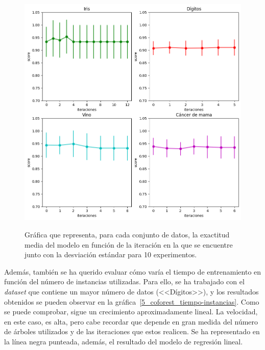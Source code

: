 \begin{figure}[h]
	\caption{Gráfica que representa, para cada conjunto de datos, la exactitud media del modelo en función de la iteración en la que se encuentre junto con la desviación estándar para 10 experimentos.}
	\centering
	\includegraphics[scale=0.7]{../img/memoria/5_coforest_score-iteraciones_individual}
	\label{5_coforest_score-iteraciones_individual}
\end{figure}


Además, también se ha querido evaluar cómo varía el tiempo de entrenamiento en función del número de instancias utilizadas. Para ello, se ha trabajado con el \textit{dataset} que contiene un mayor número de datos (<<Dígitos>>), y los resultados obtenidos se pueden observar en la gráfica~\ref{5_coforest_tiempo-instancias}. Como se puede comprobar, sigue un crecimiento aproximadamente lineal. La velocidad, en este caso, es alta, pero cabe recordar que depende en gran medida del número de árboles utilizados y de las iteraciones que estos realicen. Se ha representado en la línea negra punteada, además, el resultado del modelo de regresión lineal.

